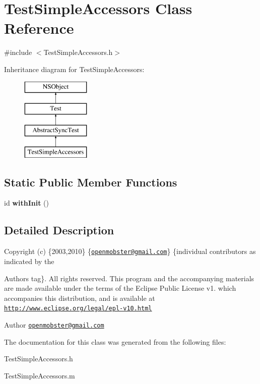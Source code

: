 \hypertarget{interface_test_simple_accessors}{
\section{\-Test\-Simple\-Accessors \-Class \-Reference}
\label{interface_test_simple_accessors}
}


{\ttfamily \#include $<$\-Test\-Simple\-Accessors.\-h$>$}

\-Inheritance diagram for \-Test\-Simple\-Accessors\-:\begin{figure}[H]
\begin{center}
\leavevmode
\includegraphics[height=4.000000cm]{interface_test_simple_accessors}
\end{center}
\end{figure}
\subsection*{\-Static \-Public \-Member \-Functions}
\begin{DoxyCompactItemize}
\item 
\hypertarget{interface_test_simple_accessors_a32a391a537ca4409825bac5c2261b32f}{
id {\bfseries with\-Init} ()}
\label{interface_test_simple_accessors_a32a391a537ca4409825bac5c2261b32f}

\end{DoxyCompactItemize}


\subsection{\-Detailed \-Description}
\-Copyright (c) \{2003,2010\} \{\href{mailto:openmobster@gmail.com}{\tt openmobster@gmail.\-com}\} \{individual contributors as indicated by the \begin{DoxyAuthor}{\-Authors}
tag\}. \-All rights reserved. \-This program and the accompanying materials are made available under the terms of the \-Eclipse \-Public \-License v1. which accompanies this distribution, and is available at \href{http://www.eclipse.org/legal/epl-v10.html}{\tt http\-://www.\-eclipse.\-org/legal/epl-\/v10.\-html}
\end{DoxyAuthor}
\begin{DoxyAuthor}{\-Author}
\href{mailto:openmobster@gmail.com}{\tt openmobster@gmail.\-com} 
\end{DoxyAuthor}


\-The documentation for this class was generated from the following files\-:\begin{DoxyCompactItemize}
\item 
\-Test\-Simple\-Accessors.\-h\item 
\-Test\-Simple\-Accessors.\-m\end{DoxyCompactItemize}
